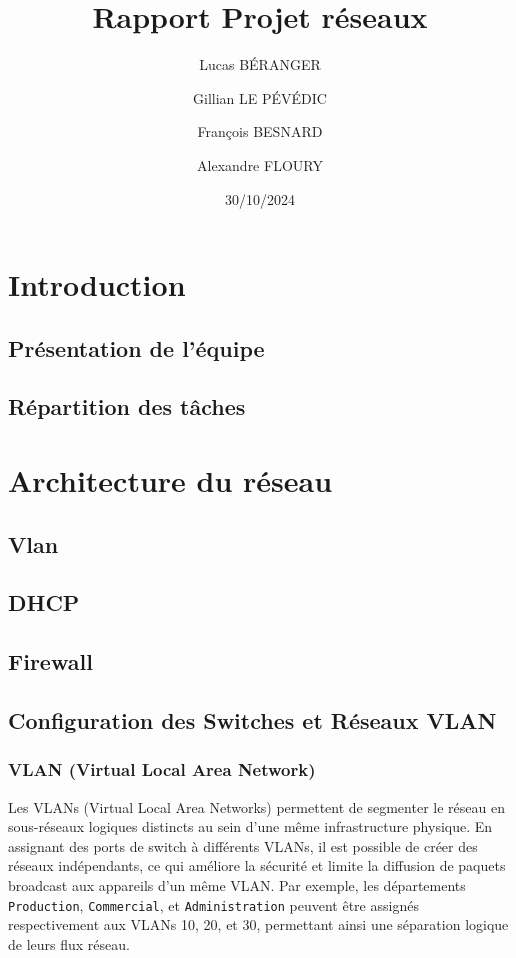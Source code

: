 \documentclass[a4paper,12pt]{report}
\title{Rapport Projet réseaux}
\author{
    Lucas BÉRANGER \and 
    Gillian LE PÉVÉDIC \and
    François BESNARD \and
    Alexandre FLOURY \and
}
\date{30/10/2024}
\begin{document}
    \maketitle  
    \newpage

    \tableofcontents
    \newpage

    \chapter{Introduction}
        \section{Présentation de l'équipe}
        \section{Répartition des tâches}


    \chapter{Architecture du réseau}
        \section{Vlan}
        \section{DHCP}
        \section{Firewall}
        \section{Configuration des Switches et Réseaux VLAN}

\subsection{VLAN (Virtual Local Area Network)}
Les VLANs (Virtual Local Area Networks) permettent de segmenter le réseau en sous-réseaux logiques distincts au sein d'une même infrastructure physique. En assignant des ports de switch à différents VLANs, il est possible de créer des réseaux indépendants, ce qui améliore la sécurité et limite la diffusion de paquets broadcast aux appareils d'un même VLAN. Par exemple, les départements \texttt{Production}, \texttt{Commercial}, et \texttt{Administration} peuvent être assignés respectivement aux VLANs 10, 20, et 30, permettant ainsi une séparation logique de leurs flux réseau.
\end{document}
